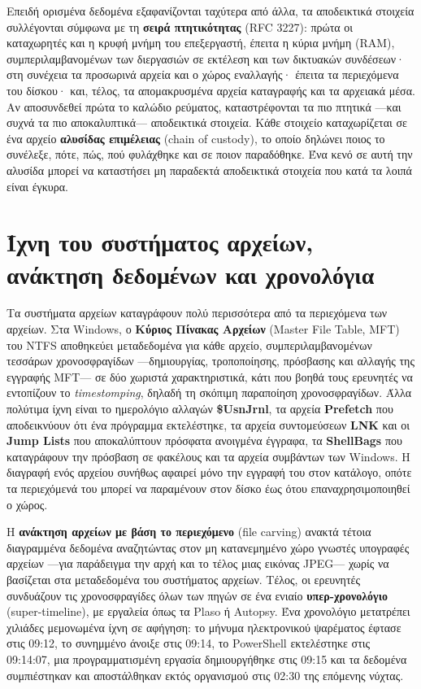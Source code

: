 Επειδή ορισμένα δεδομένα εξαφανίζονται ταχύτερα από άλλα, τα αποδεικτικά στοιχεία συλλέγονται σύμφωνα με τη \textbf{σειρά πτητικότητας} (RFC 3227): πρώτα οι καταχωρητές και η κρυφή μνήμη του επεξεργαστή, έπειτα η κύρια μνήμη (RAM), συμπεριλαμβανομένων των διεργασιών σε εκτέλεση και των δικτυακών συνδέσεων· στη συνέχεια τα προσωρινά αρχεία και ο χώρος εναλλαγής· έπειτα τα περιεχόμενα του δίσκου· και, τέλος, τα απομακρυσμένα αρχεία καταγραφής και τα αρχειακά μέσα. Αν αποσυνδεθεί πρώτα το καλώδιο ρεύματος, καταστρέφονται τα πιο πτητικά —και συχνά τα πιο αποκαλυπτικά— αποδεικτικά στοιχεία. Κάθε στοιχείο καταχωρίζεται σε ένα αρχείο \textbf{αλυσίδας επιμέλειας} (chain of custody), το οποίο δηλώνει ποιος το συνέλεξε, πότε, πώς, πού φυλάχθηκε και σε ποιον παραδόθηκε. Ένα κενό σε αυτή την αλυσίδα μπορεί να καταστήσει μη παραδεκτά αποδεικτικά στοιχεία που κατά τα λοιπά είναι έγκυρα.

\section{Ίχνη του συστήματος αρχείων, ανάκτηση δεδομένων και χρονολόγια}\label{sec:12.6}
Τα συστήματα αρχείων καταγράφουν πολύ περισσότερα από τα περιεχόμενα των αρχείων. Στα Windows, ο \textbf{Κύριος Πίνακας Αρχείων} (Master File Table, MFT) του NTFS αποθηκεύει μεταδεδομένα για κάθε αρχείο, συμπεριλαμβανομένων τεσσάρων χρονοσφραγίδων —δημιουργίας, τροποποίησης, πρόσβασης και αλλαγής της εγγραφής MFT— σε δύο χωριστά χαρακτηριστικά, κάτι που βοηθά τους ερευνητές να εντοπίζουν το \emph{timestomping}, δηλαδή τη σκόπιμη παραποίηση χρονοσφραγίδων. Άλλα πολύτιμα ίχνη είναι το ημερολόγιο αλλαγών \textbf{\$UsnJrnl}, τα αρχεία \textbf{Prefetch} που αποδεικνύουν ότι ένα πρόγραμμα εκτελέστηκε, τα αρχεία συντομεύσεων \textbf{LNK} και οι \textbf{Jump Lists} που αποκαλύπτουν πρόσφατα ανοιγμένα έγγραφα, τα \textbf{ShellBags} που καταγράφουν την πρόσβαση σε φακέλους και τα αρχεία συμβάντων των Windows. Η διαγραφή ενός αρχείου συνήθως αφαιρεί μόνο την εγγραφή του στον κατάλογο, οπότε τα περιεχόμενά του μπορεί να παραμένουν στον δίσκο έως ότου επαναχρησιμοποιηθεί ο χώρος.

Η \textbf{ανάκτηση αρχείων με βάση το περιεχόμενο} (file carving) ανακτά τέτοια διαγραμμένα δεδομένα αναζητώντας στον μη κατανεμημένο χώρο γνωστές υπογραφές αρχείων —για παράδειγμα την αρχή και το τέλος μιας εικόνας JPEG— χωρίς να βασίζεται στα μεταδεδομένα του συστήματος αρχείων. Τέλος, οι ερευνητές συνδυάζουν τις χρονοσφραγίδες όλων των πηγών σε ένα ενιαίο \textbf{υπερ-χρονολόγιο} (super-timeline), με εργαλεία όπως τα Plaso ή Autopsy. Ένα χρονολόγιο μετατρέπει χιλιάδες μεμονωμένα ίχνη σε αφήγηση: το μήνυμα ηλεκτρονικού ψαρέματος έφτασε στις 09:12, το συνημμένο άνοιξε στις 09:14, το PowerShell εκτελέστηκε στις 09:14:07, μια προγραμματισμένη εργασία δημιουργήθηκε στις 09:15 και τα δεδομένα συμπιέστηκαν και αποστάλθηκαν εκτός οργανισμού στις 02:30 της επόμενης νύχτας.

